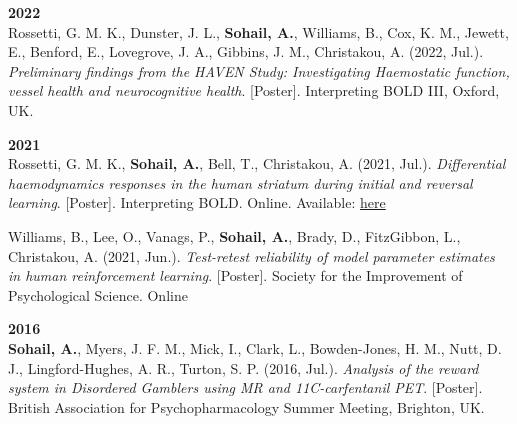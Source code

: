\textbf{2022}\\
Rossetti, G. M. K., Dunster, J. L., \textbf{Sohail, A.}, Williams, B., Cox, K. M., Jewett, E., Benford, E., Lovegrove, J. A., Gibbins, J. M., Christakou, A. (2022, Jul.). \emph{Preliminary findings from the HAVEN Study: Investigating Haemostatic function, vessel health and neurocognitive health}. [Poster]. Interpreting BOLD III, Oxford, UK.
\vspace{1em}

\textbf{2021}\\
Rossetti, G. M. K., \textbf{Sohail, A.}, Bell, T., Christakou, A. (2021, Jul.). \emph{Differential haemodynamics responses in the human striatum during initial and reversal learning}. [Poster]. Interpreting BOLD. Online. Available: \href{https://github.com/sohaamir/misc_materials/tree/main/posters}{here}
\vspace{0.5em}

Williams, B., Lee, O., Vanags, P., \textbf{Sohail, A.}, Brady, D., FitzGibbon, L., Christakou, A. (2021, Jun.). \emph{Test-retest reliability of model parameter estimates in human reinforcement learning}. [Poster]. Society for the Improvement of Psychological Science. Online
\vspace{1em}

\textbf{2016}\\
\textbf{Sohail, A.}, Myers, J. F. M., Mick, I., Clark, L., Bowden-Jones, H. M., Nutt, D. J., Lingford-Hughes, A. R., Turton, S. P. (2016, Jul.). \emph{Analysis of the reward system in Disordered Gamblers using MR and 11C-carfentanil PET}. [Poster]. British Association for Psychopharmacology Summer Meeting, Brighton, UK.